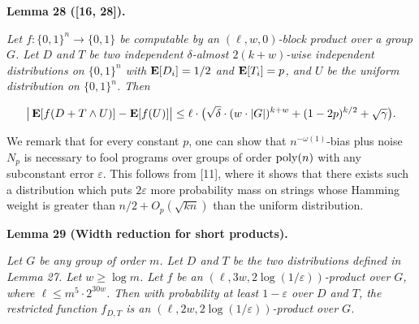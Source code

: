 

\par\medskip\noindent\textbf{
\textbf{Lemma 28}\textbf{ }([16, 28])\textbf{.}
}\par



\emph{Let $f\colon\{0,1\}^{n}\to\{0,1\}$ be computable by an $(\ell,w,0)$-block product over a group $G$.
Let $D$ and $T$ be two independent $\delta$-almost $2(k+w)$-wise independent distributions on $\{0,1\}^{n}$ with $\mathop{\bf E\/}[D_{i}]=1/2$ and $\mathop{\bf E\/}[T_{i}]=p$,
and $U$ be the uniform distribution on $\{0,1\}^{n}$.
Then}\par


\[\begin{gathered}
\big{\lvert}\mathop{\bf E\/}[f(D+T\wedge U)]-\mathop{\bf E\/}[f(U)]\big{\rvert}\leq\ell\cdot\bigl{(}\sqrt{\delta}\cdot(w\cdot\lvert G\rvert)^{k+w}+(1-2p)^{k/2}+\sqrt{\gamma}\bigr{)}.
\end{gathered}\]






We remark that for every constant $p$, one can show that $n^{-\omega(1)}$-bias plus noise $N_{p}$ is necessary to fool programs over groups of order $\textnormal{poly}(n)$ with any subconstant error $\varepsilon$.
This follows from [11], where it shows that there exists such a distribution which puts $2\varepsilon$ more probability mass on strings whose Hamming weight is greater than $n/2+O_{p}(\sqrt{kn})$ than the uniform distribution.\par





\par\medskip\noindent\textbf{
\textbf{Lemma 29}\textbf{ }(Width reduction for short products)\textbf{.}
}\par



\emph{Let $G$ be any group of order $m$.
Let $D$ and $T$ be the two distributions defined in Lemma 27.
Let $w\geq\log m$.
Let $f$ be an $(\ell,3w,2\log(1/\varepsilon))$-product over $G$, where $\ell\leq m^{5}\cdot 2^{30w}$.
Then with probability at least $1-\varepsilon$ over $D$ and $T$, the restricted function $f_{D,T}$ is an $(\ell,2w,2\log(1/\varepsilon))$-product over $G$.}\par



